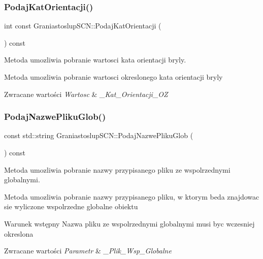 \subsubsection{\texorpdfstring{Podaj\+Kat\+Orientacji()}{PodajKatOrientacji()}}
{\footnotesize\ttfamily int const Graniastoslup\+S\+C\+N\+::\+Podaj\+Kat\+Orientacji (\begin{DoxyParamCaption}{ }\end{DoxyParamCaption}) const\hspace{0.3cm}{\ttfamily [inline]}}



Metoda umozliwia pobranie wartosci kata orientacji bryly. 

Metoda umozliwia pobranie wartosci okreslonego kata orientacji bryly 
\begin{DoxyRetVals}{Zwracane wartości}
{\em Wartosc} & {\itshape \+\_\+\+Kat\+\_\+\+Orientacji\+\_\+\+OZ} \\
\hline
\end{DoxyRetVals}
\mbox{\label{classGraniastoslupSCN_ad3d658eb048fd25af6a31a6416e02908}} 
\subsubsection{\texorpdfstring{Podaj\+Nazwe\+Pliku\+Glob()}{PodajNazwePlikuGlob()}}
{\footnotesize\ttfamily const std\+::string Graniastoslup\+S\+C\+N\+::\+Podaj\+Nazwe\+Pliku\+Glob (\begin{DoxyParamCaption}{ }\end{DoxyParamCaption}) const\hspace{0.3cm}{\ttfamily [inline]}}



Metoda umozliwia pobranie nazwy przypisanego pliku ze wspolrzednymi globalnymi. 

Metoda umozliwia pobranie nazwy przypisanego pliku, w ktorym beda znajdowac sie wyliczone wspolrzedne globalne obiektu \begin{DoxyPrecond}{Warunek wstępny}
Nazwa pliku ze wspolrzednymi globalnymi musi byc wczesniej okreslona 
\end{DoxyPrecond}

\begin{DoxyRetVals}{Zwracane wartości}
{\em Parametr} & {\itshape \+\_\+\+Plik\+\_\+\+Wsp\+\_\+\+Globalne} \\
\hline
\end{DoxyRetVals}
\mbox{\label{classGraniastoslupSCN_a48c31869ef862c487bb511d8a121005b}} 
